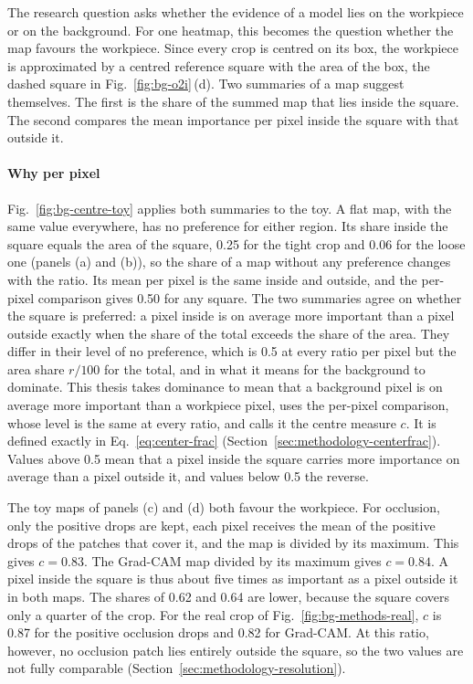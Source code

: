 The research question asks whether the evidence of a model lies on the workpiece or on
the background. For one heatmap, this becomes the question whether the map favours the
workpiece. Since every crop is centred on its box, the workpiece is approximated by a
centred reference square with the area of the box, the dashed square in
Fig.~\ref{fig:bg-o2i}\,(d). Two summaries of a map suggest themselves. The first is the
share of the summed map that lies inside the square. The second compares the mean
importance per pixel inside the square with that outside it.

\paragraph{Why per pixel}
Fig.~\ref{fig:bg-centre-toy} applies both summaries to the toy. A flat map, with the same
value everywhere, has no preference for either region. Its share inside the square
equals the area of the square, 0.25 for the tight crop and 0.06 for the loose one
(panels (a) and (b)), so the share of a map without any preference changes with the
ratio. Its mean per pixel is the same inside and outside, and the per-pixel comparison
gives 0.50 for any square. The two summaries agree on whether the square is preferred:
a pixel inside is on average more important than a pixel outside exactly when the share
of the total exceeds the share of the area. They differ in their level of no preference,
which is 0.5 at every ratio per pixel but the area share $r/100$ for the total, and in
what it means for the background to dominate. This thesis takes dominance to mean that a
background pixel is on average more important than a workpiece pixel, uses the per-pixel
comparison, whose level is the same at every ratio, and calls it the centre measure
$c$. It is defined exactly in Eq.~\eqref{eq:center-frac}
(Section~\ref{sec:methodology-centerfrac}). Values above 0.5 mean that a pixel inside the
square carries more importance on average than a pixel outside it, and values below 0.5
the reverse.

The toy maps of panels (c) and (d) both favour the workpiece. For occlusion, only the
positive drops are kept, each pixel receives the mean of the positive drops of the
patches that cover it, and the map is divided by its maximum. This gives $c = 0.83$. The Grad-CAM map divided by its
maximum gives $c = 0.84$. A pixel inside the square is thus about five times as
important as a pixel outside it in both maps. The shares of 0.62 and 0.64 are lower, because the
square covers only a quarter of the crop. For the real crop of
Fig.~\ref{fig:bg-methods-real}, $c$ is 0.87 for the positive occlusion drops and 0.82 for
Grad-CAM. At this ratio, however, no occlusion patch lies
entirely outside the square, so the two values are not fully comparable
(Section~\ref{sec:methodology-resolution}).

